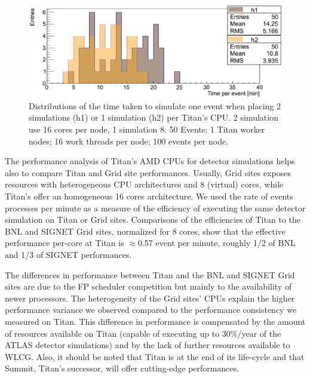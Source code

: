 \begin{figure}[htp]
    \includegraphics[clip,width=\columnwidth]{figures/tx8_tx16_comparison_vsquashed.pdf}
    \vspace{-0.3in}
    \caption{Distributions of the time taken to simulate one event when
    placing 2 simulations (h1) or 1 simulation (h2) per Titan's CPU\@. 2
    simulation use 16 cores per node, 1 simulation 8. 50 Events; 1 Titan
    worker nodes; 16 work threads per node; 100 events per
    node.}\label{fig:comparison-8-16cores}
\end{figure}

The performance analysis of Titan's AMD CPUs for detector simulations helps
also to compare Titan and Grid site performances. Usually, Grid sites exposes
resources with heterogeneous CPU architectures and 8 (virtual) cores, while
Titan's offer an homogeneous 16 cores architecture. We used the rate of
events processes per minute as a measure of the efficiency of executing the
same detector simulation on Titan or Grid sites. Comparisons of the
efficiencies of Titan to the BNL and SIGNET Grid sites, normalized for 8
cores, show that the effective performance per-core at Titan is
\(\approx\)0.57 event per minute, roughly 1/2 of BNL and  1/3 of SIGNET
performances.

The differences in performance between Titan and the BNL and SIGNET Grid
sites are due to the FP scheduler competition but mainly to the availability
of newer processors. 
The heterogeneity of the Grid sites' CPUs explain the higher performance
variance we observed compared to the performance consistency we measured on
Titan. This difference in performance is compensated by the amount of
resources available on Titan (capable of executing up to 30\%/year of the
ATLAS detector simulations) and by the lack of further resources available to
WLCG\@. Also, it should be noted that Titan is at the end of its life-cycle
and that Summit, Titan's successor, will offer cutting-edge performances.

